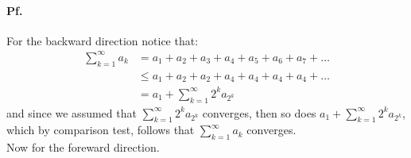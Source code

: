 \documentclass[11pt]{article}
\begin{document}
\paragraph{Pf.}
For the backward direction notice that:
\begin{align*}
	\sum\limits_{k=1}^{\infty}a_k &= a_1 + a_2 + a_3 + a_4 + a_5 + a_6 + a_7 + \dots\\
	&\leq a_1 + a_2 + a_2 + a_4 + a_4 + a_4 + a_4 + \dots\\
	&= a_1 + \sum\limits_{k=1}^{\infty}2^k a_{2^k}
\end{align*}
and since we assumed that $ \sum\limits_{k=1}^{\infty}2^k a_{2^k}$ converges, then so does $a_1 + \sum\limits_{k=1}^{\infty}2^k a_{2^k}$, which by comparison test, follows that $\sum\limits_{k=1}^{\infty}a_k$ converges.\\
Now for the foreward direction.
\end{document}
